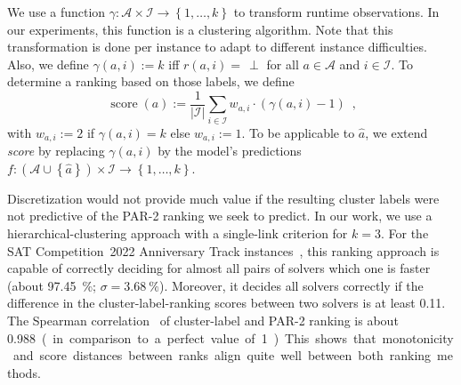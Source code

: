 \documentclass[runningheads]{llncs}
\begin{document}
We use a function $\gamma\!: {\mathcal{A} \times \mathcal{I}} \rightarrow \left\lbrace 1, \dots, k \right\rbrace$ to transform runtime observations.
In our experiments, this function is a clustering algorithm.
Note that this transformation is done per instance to adapt to different instance difficulties. 
Also, we define ${\gamma\!\left(a, i\right) := k}$ iff $r\!\left(a, i\right) = \,\perp$ for all $a \in \mathcal{A}$ and $i \in \mathcal{I}$.
To determine a ranking based on those labels, we define
\begin{equation}
  \operatorname{score}\!\left(a\right) := \frac{1}{|\mathcal{I}|} \sum_{i \in \mathcal{I}} w_{a,i} \cdot \left(\gamma\!\left(a, i\right) - 1\right) \enspace \textrm{,}
  \label{eq:rankingeq}
\end{equation}
with $w_{a,i} := 2$ if $\gamma\!\left(a, i\right) = k$ else $w_{a,i} := 1$.
To be applicable to $\hat{a}$, we extend \emph{score} by replacing $\gamma\!\left(a, i\right)$ by the model's predictions $f\!: \left(\mathcal{A} \cup \left\lbrace \hat{a} \right\rbrace\right) \times \mathcal{I} \rightarrow \left\lbrace 1, \dots, k \right\rbrace$.

Discretization would not provide much value if the resulting cluster labels were not predictive of the PAR-2 ranking we seek to predict.
In our work, we use a hierarchical-clustering approach with a single-link criterion for $k = 3$.
For the SAT Competition~2022 Anniversary Track instances~\cite{sat2022}, this ranking approach is capable of correctly deciding for almost all pairs of solvers which one is faster (about \SI{97.45}{\%}; $\sigma = \SI{3.68}{\%}$).
Moreover, it decides all solvers correctly if the difference in the cluster-label-ranking scores between two solvers is at least \SI{0.11}{}.
The Spearman correlation~\cite{de2016comparing} of cluster-label and PAR-2 ranking is about \SI{0.988} (in comparison to a perfect value of \SI{1}).
This shows that monotonicity and score distances between ranks align quite well between both ranking methods.
\end{document}
